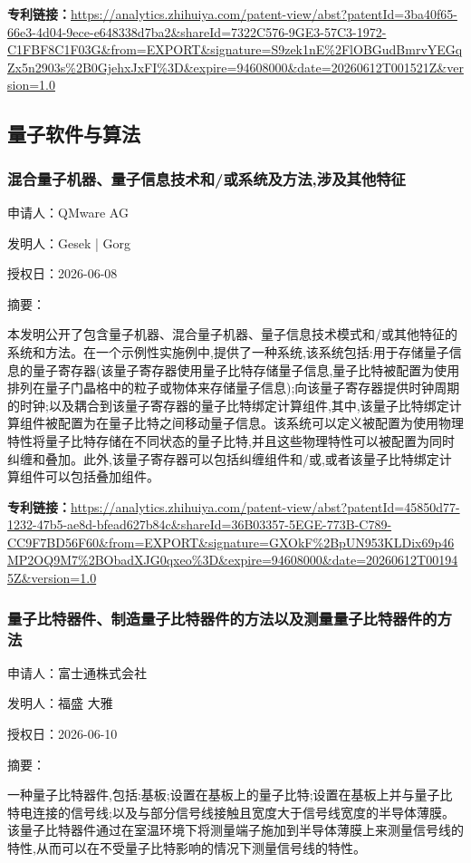 \documentclass[12pt,a4paper]{ctexart}
\begin{document}
\noindent\textbf{专利链接：}\url{https://analytics.zhihuiya.com/patent-view/abst?patentId=3ba40f65-66e3-4d04-9ece-e648338d7ba2&shareId=7322C576-9GE3-57C3-1972-C1FBF8C1F03G&from=EXPORT&signature=S9zek1nE%2FlOBGudBmrvYEGqZx5n2903s%2B0GjehxJxFI%3D&expire=94608000&date=20260612T001521Z&version=1.0}


\subsection{ 量子软件与算法 }

\subsubsection{ 混合量子机器、量子信息技术和/或系统及方法,涉及其他特征 }

申请人：QMware AG

发明人：Gesek | Gorg

授权日：2026-06-08

摘要：

本发明公开了包含量子机器、混合量子机器、量子信息技术模式和/或其他特征的系统和方法。在一个示例性实施例中,提供了一种系统,该系统包括:用于存储量子信息的量子寄存器(该量子寄存器使用量子比特存储量子信息,量子比特被配置为使用排列在量子门晶格中的粒子或物体来存储量子信息);向该量子寄存器提供时钟周期的时钟;以及耦合到该量子寄存器的量子比特绑定计算组件,其中,该量子比特绑定计算组件被配置为在量子比特之间移动量子信息。该系统可以定义被配置为使用物理特性将量子比特存储在不同状态的量子比特,并且这些物理特性可以被配置为同时纠缠和叠加。此外,该量子寄存器可以包括纠缠组件和/或,或者该量子比特绑定计算组件可以包括叠加组件。

\noindent\textbf{专利链接：}\url{https://analytics.zhihuiya.com/patent-view/abst?patentId=45850d77-1232-47b5-ae8d-bfead627b84c&shareId=36B03357-5EGE-773B-C789-CC9F7BD56F60&from=EXPORT&signature=GXOkF%2BpUN953KLDix69p46MP2OQ9M7%2BObadXJG0qxeo%3D&expire=94608000&date=20260612T001945Z&version=1.0}

\subsubsection{ 量子比特器件、制造量子比特器件的方法以及测量量子比特器件的方法 }

申请人：富士通株式会社

发明人：福盛 大雅

授权日：2026-06-10

摘要：

一种量子比特器件,包括:基板;设置在基板上的量子比特;设置在基板上并与量子比特电连接的信号线;以及与部分信号线接触且宽度大于信号线宽度的半导体薄膜。该量子比特器件通过在室温环境下将测量端子施加到半导体薄膜上来测量信号线的特性,从而可以在不受量子比特影响的情况下测量信号线的特性。
\end{document}
